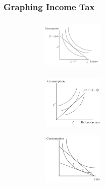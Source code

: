 \documentclass[11pt, english]{article}
\begin{document}
		\subsubsection{Graphing Income Tax}

	\begin{figure}[H]      
        \begin{center}                     
                \begin{subfigure}[t]{3.5cm}  
                \begin{center}             
                        \includegraphics[width=3cm,height=2.5cm]{EC315-IMG/48.png}
                \end{center}               
                \end{subfigure}            
                \begin{subfigure}[t]{3.5cm}  
                \begin{center}                                                    
                        \includegraphics[width=3cm,height=2.5cm]{EC315-IMG/49.png}
                \end{center}   
                \end{subfigure}
		\begin{subfigure}[t]{3.5cm}                                         
                \begin{center}                                                    
                        \includegraphics[width=3cm,height=2.5cm]{EC315-IMG/50.png}
                \end{center}             
                \end{subfigure}
		\begin{subfigure}[t]{3.5cm}                                         

\end{subfigure}
\end{center}
\end{figure}
\end{document}
